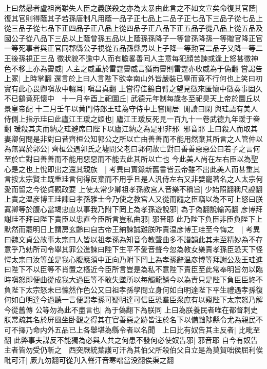 上曰然曏者盧祖尚雖失人臣之義朕殺之亦為太暴由此言之不如文宣矣命復其官蔭|{
	復其官則得蔭其子若孫唐制凡用蔭一品子正七品上二品子正七品下三品子從七品上從三品子從七品下正四品子正八品上從四品子正八品下正五品子從八品上從五品及國公子從八品下三品以上蔭曾孫五品以上蔭孫孫降子一等曾孫降孫一等贈官降正官一等死事者與正官同郡縣公子視從五品孫縣男以上子降一等勲官二品子又降一等二王後孫視正三品}
徵狀貌不逾中人而有膽畧善囘人主意每犯顔苦諫或逢上怒甚徵神色不移上亦為霽威|{
	人主之威重於雷霆霽威言猶雨霽則雷霆亦收威為于偽翻}
嘗謁告上冢|{
	上時掌翻}
還言於上曰人言陛下欲幸南山外皆嚴裝已畢而竟不行何也上笑曰初實有此心畏卿嗔故中輟耳|{
	嗔昌真翻}
上嘗得佳鷂自臂之望見徵來匿懷中徵奏事固久不已鷂竟死懷中　十一月辛酉上祀圜丘|{
	武德元年制每歲冬至祀昊天上帝於圜丘以景皇帝配}
十二月壬午以黄門侍郎王珪為守侍中上嘗閒居|{
	閒讀曰閑}
與珪語有美人侍側上指示珪曰此廬江王瑗之姬也|{
	廬江王瑗反死見一百九十一卷武德九年瑗于眷翻}
瑗殺其夫而納之珪避席曰陛下以廬江納之為是邪非邪|{
	邪音耶}
上曰殺人而取其妻卿何問是非對曰昔齊桓公知郭公之所以亡由善善而不能用然棄其所言之人管仲以為無異於郭公|{
	齊桓公遇郭氏之墟問父老曰郭何故亡對曰善善惡惡公曰若子之言何至於亡對曰善善而不能用惡惡而不能去此其所以亡也}
今此美人尚在左右臣以為聖心是之也上悅即出之還其親族　|{
	考異曰實錄新舊書皆云帝雖不出此美人而甚重其言按太宗賢主既重珪言何得反棄而不用乎且是人汎侍左右又非嬖寵著名之人太宗何愛而留之今從貞觀政要}
上使太常少卿祖孝孫教宫人音樂不稱旨|{
	少始照翻稱尺證翻}
上責之温彦博王珪諫曰孝孫雅士今乃使之教宫人又從而譴之臣竊以為不可上怒曰朕寘卿等於腹心當竭忠直以事我乃附下罔上為孝孫遊說邪|{
	為于偽翻說輸芮翻}
彦博拜謝珪不拜曰陛下責臣以忠直今臣所言豈私曲邪|{
	邪音耶}
此乃陛下負臣非臣負陛下上默然而罷明日上謂房玄齡曰自古帝王納諫誠難朕昨責温彦博王珪至今悔之　|{
	考異曰魏文貞公故事太宗曰人皆以祖孝孫為知音令教聲曲多不諧韻此其未至精妙為不存意乎乃勅所司令舉其罪公進諫曰陛下生平不愛音聲今忽為教女樂責孝孫臣恐天下怪愕太宗曰汝等並是我心腹應須中正向乃附下罔上為孝孫辭温彦博等拜謝公及王珪進曰陛下不以臣等不肖置之樞近今臣所言豈是為私不意陛下責臣至此常奉明旨勿以臨時嗔怒即便曲從成我大過臣等不敢失墜所以每觸龍鱗今以為責只是陛下負臣臣終不負陛下太宗怒未已懍然作色公又曰祖孝孫學問立身何如白明達陛下平生禮遇孝孫復何如白明達今過聽一言便謂孝孫可疑明達可信臣恐羣臣衆庶有以窺陛下太宗怒乃解今從舊傳}
公等勿為此不盡言也|{
	為于偽翻下為朕同}
上曰為朕養民者唯在都督刺史朕常疏其名於屏風坐卧觀之得其在官善惡之跡皆注於名下以備黜陟縣令尤為親民不可不擇乃命内外五品已上各舉堪為縣令者以名聞　上曰比有奴告其主反者|{
	比毗至翻}
此弊事夫謀反不能獨為必與人共之何患不發何必使奴告邪|{
	邪音耶}
自今有奴告主者皆勿受仍斬之　西突厥統葉護可汗為其伯父所殺伯父自立是為莫賀咄侯屈利俟毗可汗|{
	厥九勿翻可從刋入聲汗音寒咄當没翻俟渠之翻}
